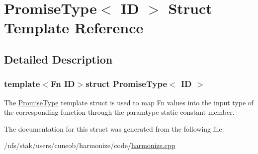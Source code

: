 \hypertarget{structPromiseType}{\section{Promise\-Type$<$ I\-D $>$ Struct Template Reference}
\label{structPromiseType}
}


\subsection{Detailed Description}
\subsubsection*{template$<$Fn I\-D$>$struct Promise\-Type$<$ I\-D $>$}

The {\ttfamily \hyperlink{structPromiseType}{Promise\-Type}} template struct is used to map {\ttfamily Fn} values into the input type of the corresponding function through the {\ttfamily paramtype} static constant member. 

The documentation for this struct was generated from the following file\-:\begin{DoxyCompactItemize}
\item 
/nfs/stak/users/cuneob/harmonize/code/\hyperlink{harmonize_8cpp}{harmonize.\-cpp}\end{DoxyCompactItemize}
